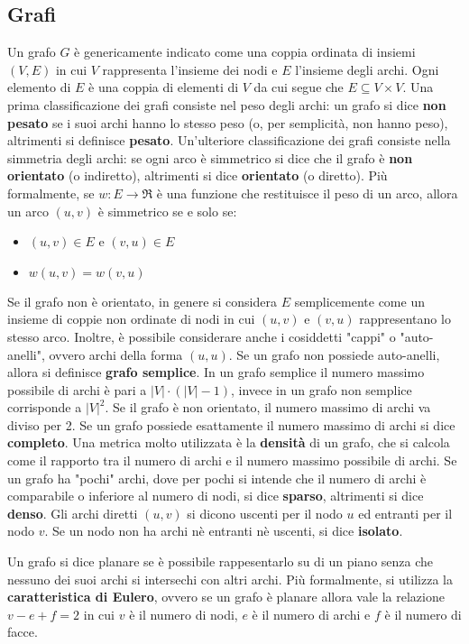 \documentclass[a4paper]{article}
\begin{document}
	\subsection{Grafi}
	Un grafo $G$ è genericamente indicato come una coppia ordinata di insiemi $(V,E)$ in cui $V$ rappresenta l'insieme dei nodi e $E$ l'insieme degli archi. Ogni elemento di $E$ è una coppia di elementi di $V$ da cui segue che $E \subseteq V \times V$. Una prima classificazione dei grafi consiste nel peso degli archi: un grafo si dice \textbf{non pesato} se i suoi archi hanno lo stesso peso (o, per semplicità, non hanno peso), altrimenti si definisce \textbf{pesato}. Un'ulteriore classificazione dei grafi consiste nella simmetria degli archi: se ogni arco è simmetrico si dice che il grafo è \textbf{non orientato} (o indiretto), altrimenti si dice \textbf{orientato} (o diretto). Più formalmente, se $w:E \rightarrow \Re$ è una funzione che restituisce il peso di un arco, allora un arco $(u,v)$ è simmetrico se e solo se:
	\begin{itemize}
		\item $(u,v) \in E$ e $(v,u) \in E$
		\item $w(u,v) = w(v,u)$
	\end{itemize}
	Se il grafo non è orientato, in genere si considera $E$ semplicemente come un insieme di coppie non ordinate di nodi in cui $(u,v)$ e $(v,u)$ rappresentano lo stesso arco.
	Inoltre, è possibile considerare anche i cosiddetti "cappi" o "auto-anelli", ovvero archi della forma $(u,u)$. Se un grafo non possiede auto-anelli, allora si definisce \textbf{grafo semplice}. In un grafo semplice il numero massimo possibile di archi è pari a $|V|\cdot (|V|-1)$, invece in un grafo non semplice corrisponde a $|V|^2$. Se il grafo è non orientato, il numero massimo di archi va diviso per 2. Se un grafo possiede esattamente il numero massimo di archi si dice \textbf{completo}.
	Una metrica molto utilizzata è la \textbf{densità} di un grafo, che si calcola come il rapporto tra il numero di archi e il numero massimo possibile di archi. Se un grafo ha "pochi" archi, dove per pochi si intende che il numero di archi è comparabile o inferiore al numero di nodi, si dice \textbf{sparso}, altrimenti si dice \textbf{denso}. Gli archi diretti $(u,v)$ si dicono uscenti per il nodo $u$ ed entranti per il nodo $v$. Se un nodo non ha archi nè entranti nè uscenti, si dice \textbf{isolato}.
	
	Un grafo si dice planare se è possibile rappesentarlo su di un piano senza che nessuno dei suoi archi si intersechi con altri archi. Più formalmente, si utilizza la \textbf{caratteristica di Eulero}, ovvero se un grafo è planare allora vale la relazione $v-e+f=2$ in cui $v$ è il numero di nodi, $e$ è il numero di archi e $f$ è il numero di facce.
	
\end{document}
